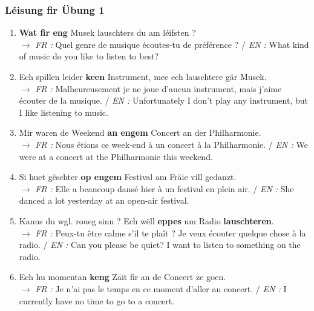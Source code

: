 \subsubsection*{Léisung fir Übung 1}
\begin{enumerate}
    \item \textbf{Wat fir eng} Musek lauschters du am léifsten ? \\
    $\rightarrow$ \textit{FR :} Quel genre de musique écoutes-tu de préférence ? / \textit{EN :} What kind of music do you like to listen to best?
    \item Ech spillen leider \textbf{keen} Instrument, mee ech lauschtere gär Musek. \\
    $\rightarrow$ \textit{FR :} Malheureusement je ne joue d'aucun instrument, mais j'aime écouter de la musique. / \textit{EN :} Unfortunately I don't play any instrument, but I like listening to music.
    \item Mir waren de Weekend \textbf{an engem} Concert an der Philharmonie. \\
    $\rightarrow$ \textit{FR :} Nous étions ce week-end à un concert à la Philharmonie. / \textit{EN :} We were at a concert at the Philharmonie this weekend.
    \item Si huet gëschter \textbf{op engem} Festival am Fräie vill gedanzt. \\
    $\rightarrow$ \textit{FR :} Elle a beaucoup dansé hier à un festival en plein air. / \textit{EN :} She danced a lot yesterday at an open-air festival.
    \item Kanns du wgl. roueg sinn ? Ech wëll \textbf{eppes} um Radio \textbf{lauschteren}. \\
    $\rightarrow$ \textit{FR :} Peux-tu être calme s'il te plaît ? Je veux écouter quelque chose à la radio. / \textit{EN :} Can you please be quiet? I want to listen to something on the radio.
    \item Ech hu momentan \textbf{keng} Zäit fir an de Concert ze goen. \\
    $\rightarrow$ \textit{FR :} Je n'ai pas le temps en ce moment d'aller au concert. / \textit{EN :} I currently have no time to go to a concert.
\end{enumerate}

